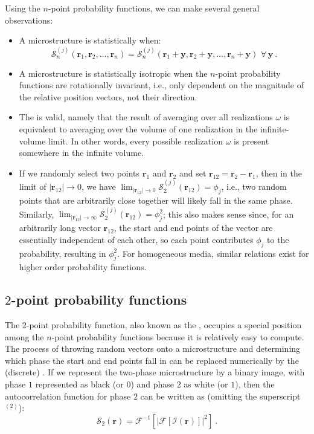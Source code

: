 Using the $n$-point probability functions, we can make several general observations:
\begin{itemize}
	\item A microstructure is statistically  when:
	\begin{equation}
		\mathcal{S}^{(j)}_n(\mathbf{r}_1,\mathbf{r}_2,\ldots,\mathbf{r}_n)=\mathcal{S}^{(j)}_n(\mathbf{r}_1+\mathbf{y},\mathbf{r}_2+\mathbf{y},\ldots,\mathbf{r}_n+\mathbf{y})\,\,\forall\,\mathbf{y}\ .
	\end{equation}
	\item A microstructure is statistically isotropic when the $n$-point probability functions are rotationally invariant, i.e., only dependent on the magnitude of the relative position vectors, not their direction.
	\item The  is valid, namely that the result of averaging over all realizations $\omega$ is equivalent to averaging over the volume of one realization in the infinite-volume limit. In other words, every possible realization $\omega$ is present somewhere in the infinite volume.
	\item If we randomly select two points $\mathbf{r}_1$ and $\mathbf{r}_2$ and set $\mathbf{r}_{12}=\mathbf{r}_2-\mathbf{r}_1$, then in the limit of $\vert\mathbf{r}_{12}\vert\rightarrow 0$, we have $\lim_{\vert\mathbf{r}_{12}\vert\rightarrow 0}\mathcal{S}^{(j)}_2(\mathbf{r}_{12})=\phi_j$, i.e., two random points that are arbitrarily close together will likely fall in the same phase.  Similarly, $\lim_{\vert\mathbf{r}_{12}\vert\rightarrow \infty}\mathcal{S}^{(j)}_2(\mathbf{r}_{12})=\phi^2_j$; this also makes sense since, for an arbitrarily long vector $\mathbf{r}_{12}$, the start and end points of the vector are essentially independent of each other, so each point contributes $\phi_j$ to the probability, resulting in $\phi^2_j$.  For homogeneous media, similar relations exist for higher order probability functions.
\end{itemize}

\subsection{$2$-point probability functions}\label{\chabbr:ssec:twopoint}
The $2$-point probability function, also known as the , occupies a special position among the $n$-point probability functions because it is relatively easy to compute. The process of throwing random vectors onto a microstructure and determining which phase the start and end points fall in can be replaced numerically by the (discrete) . If we represent the two-phase microstructure by a binary image, with phase $1$ represented as black (or $0$) and phase $2$ as white (or $1$), then the autocorrelation function for phase $2$ can be written as (omitting the superscript $^{(2)}$):
\begin{equation}
	\mathcal{S}_2(\mathbf{r}) = \mathcal{F}^{-1}\left[\vert\mathcal{F}[\mathcal{I}(\mathbf{r})]\vert^2\right]\ .
\end{equation}

